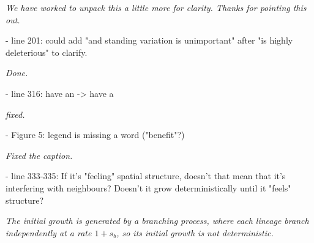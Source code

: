 \documentclass[12pt,letterpaper]{article}
\newcommand{\response}[1]{\emph{ \color{blue} #1}}
\begin{document}
\response{We have worked to unpack this a little more for clarity. Thanks for pointing this out.}

- line 201: could add "and standing variation is unimportant" after "is highly deleterious" to clarify.

\response{Done.}

- line 316: have an -> have a

\response{fixed.}

- Figure 5: legend is missing a word ("benefit"?)

\response{Fixed the caption.}

- line 333-335: If it's "feeling" spatial structure, doesn't that mean that it's interfering with neighbours? Doesn't it grow deterministically until it "feels" structure?

\response{The initial growth is generated by a branching process, where each lineage branch independently at a rate $1+s_b$, so its initial growth is not deterministic.}
\end{document}
